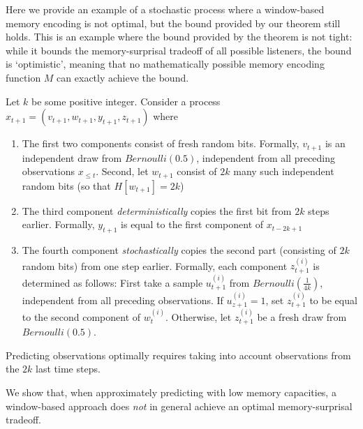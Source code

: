 \documentclass[11pt,letterpaper]{article}
\newcounter{theorem}
\begin{document}
Here we provide an example of a stochastic process where a window-based memory encoding is not optimal, but the bound provided by our theorem still holds.
This is an example where the bound provided by the theorem is not tight: while it bounds the memory-surprisal tradeoff of all possible listeners, the bound is `optimistic', meaning that no mathematically possible memory encoding function $M$ can exactly achieve the bound.

Let $k$ be some positive integer.
Consider a process
$x_{t+1} = (v_{t+1}, w_{t+1}, y_{t+1}, z_{t+1})$
where
\begin{enumerate}
	\item The first two components consist of fresh random bits. Formally, $v_{t+1}$ is an independent draw from $Bernoulli(0.5)$, independent from all preceding observations $x_{\leq t}$.
		Second, let $w_{t+1}$ consist of $2k$ many such independent random bits (so that $H[w_{t+1}] = 2k$)
	\item The third component \emph{deterministically} copies the first bit from $2k$ steps earlier. Formally, $y_{t+1}$ is equal to the first component of $x_{t-2k+1}$
	\item The fourth component \emph{stochastically} copies the second part (consisting of $2k$ random bits) from one step earlier. Formally, each component $z_{t+1}^{(i)}$ is determined as follows: First take a sample $u_{t+1}^{(i)}$ from $Bernoulli(\frac{1}{4k})$, independent from all preceding observations.
		If $u_{z+1}^{(i)}=1$, set $z_{t+1}^{(i)}$ to be equal to the second component of $w_{t}^{(i)}$.
		Otherwise, let $z_{t+1}^{(i)}$ be a fresh draw from $Bernoulli(0.5)$.
\end{enumerate}

Predicting observations optimally requires taking into account observations from the $2k$ last time steps.

We show that, when approximately predicting with low memory capacities, a window-based approach does \emph{not} in general achieve an optimal memory-surprisal tradeoff.
\end{document}

